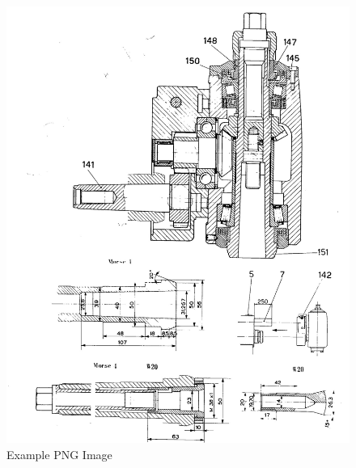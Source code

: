 \newpage
\begin{figure}[h]
    \centering
    \includegraphics[width=1.0\linewidth]{./images/page_36}
    \caption{Example PNG Image}
    \label{fig:milling_head_2}
\end{figure}
